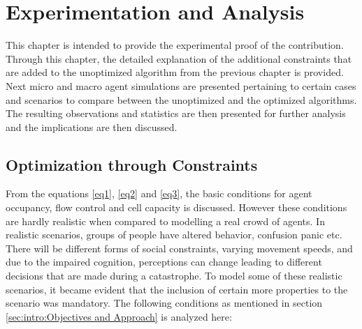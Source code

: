 \chapter{Experimentation and Analysis\label{ch:Experimentation and Analysis}}

This chapter is intended to provide the experimental proof of the contribution. Through this chapter, the detailed explanation of the additional constraints that are added to the unoptimized algorithm from the previous chapter is provided. Next micro and macro agent simulations are presented pertaining to certain cases and scenarios to compare between the unoptimized and the optimized algorithms. The resulting observations and statistics are then presented for further analysis and the implications are then discussed.

\section{Optimization through Constraints}
\label{sec: Optimization through Constraints}

From the equations \ref{eq1}, \ref{eq2} and \ref{eq3}, the basic conditions for agent occupancy, flow control and cell capacity is discussed. However these conditions are hardly realistic when compared to modelling a real crowd of agents. In realistic scenarios, groups of people have altered behavior, confusion panic etc. There will be different forms of social constraints, varying movement speeds, and due to the impaired cognition, perceptions can change leading to different decisions that are made during a catastrophe. To model some of these realistic scenarios, it became evident that the inclusion of certain more properties to the scenario was mandatory. The following conditions as mentioned in section \ref{sec:intro:Objectives and Approach} is analyzed here:

